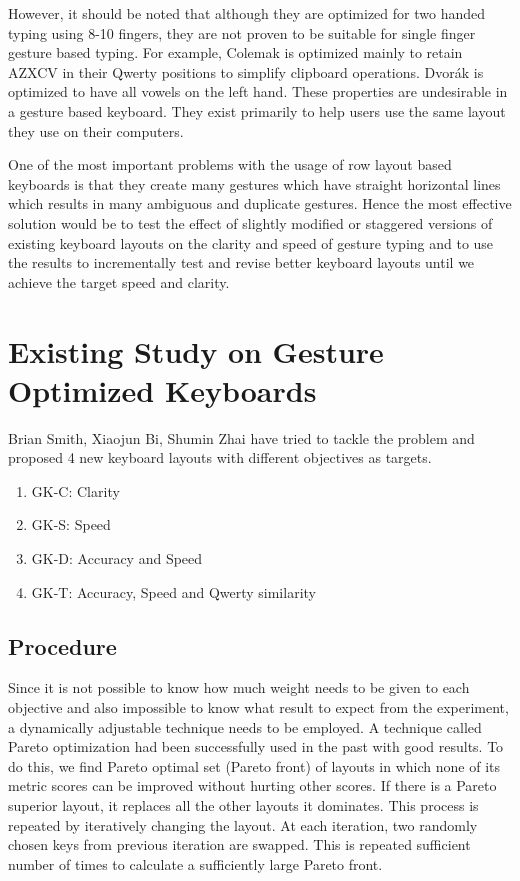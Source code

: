 \documentclass[MTech]{iitmdiss}
\begin{document}
However, it should be noted that although they are optimized for two handed typing using 8-10 fingers, they are not proven to be suitable for single finger gesture based typing. For example, Colemak is optimized mainly to retain AZXCV in their Qwerty positions to simplify clipboard operations. Dvorák is optimized to have all vowels on the left hand. These properties are undesirable in a gesture based keyboard. They exist primarily to help users use the same layout they use on their computers.


One of the most important problems with the usage of row layout based keyboards is that they create many gestures which have straight horizontal lines which results in many ambiguous and duplicate gestures. Hence the most effective solution would be to test the effect of slightly modified or staggered versions of existing keyboard layouts on the clarity and speed of gesture typing and to use the results to incrementally test and revise better keyboard layouts until we achieve the target speed and clarity.


\section{Existing Study on Gesture Optimized Keyboards}
Brian Smith, Xiaojun Bi, Shumin Zhai \citet{gesturerecog} have tried to tackle the problem and proposed 4 new keyboard layouts with different objectives as targets.

\begin{enumerate}
	
	\item GK-C: Clarity
	\item GK-S: Speed
	\item GK-D: Accuracy and Speed
	\item GK-T: Accuracy, Speed and Qwerty similarity
\end{enumerate}


\subsection{Procedure}
Since it is not possible to know how much weight needs to be given to each objective and also impossible to know what result to expect from the experiment, a dynamically adjustable technique needs to be employed. A technique called Pareto optimization had been successfully used in the past with good results. To do this, we find Pareto optimal set (Pareto front) of layouts in which none of its metric scores can be improved without hurting other scores. If there is a Pareto superior layout, it replaces all the other layouts it dominates. This process is repeated by iteratively changing the layout. At each iteration, two randomly chosen keys from previous iteration are swapped. This is repeated sufficient number of times to calculate a sufficiently large Pareto front. 
\end{document}
